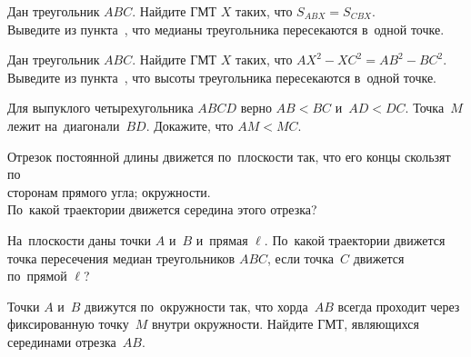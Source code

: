 \begin{problems}
\item
\subproblem{}%
Дан треугольник $ABC$.
Найдите ГМТ $X$ таких, что $S_{ABX} = S_{CBX}$.
\\
\subproblem
Выведите из пункта~,
что медианы треугольника пересекаются в~одной точке.

\item
\subproblem{}%
Дан треугольник $ABC$.
Найдите ГМТ $X$ таких, что $AX^2 - XC^2 = AB^2 - BC^2$.
\\
\subproblem
Выведите из пункта~,
что высоты треугольника пересекаются в~одной точке.


\item
Для выпуклого четырехугольника $ABCD$ верно $AB < BC$ и~$AD < DC$.
Точка~$M$ лежит на~диагонали~$BD$.
Докажите, что $AM < MC$.

\item
Отрезок постоянной длины движется по~плоскости так, что его концы скользят по
\\
\subproblem сторонам прямого угла;
\qquad
\subproblem окружности.
\\
По~какой траектории движется середина этого отрезка?

\item
На~плоскости даны точки $A$ и~$B$ и~прямая $\ell$.
По~какой траектории движется точка пересечения медиан треугольников $ABC$, если
точка~$C$ движется по~прямой $\ell$?

\item
Точки $A$ и~$B$ движутся по~окружности так, что хорда~$AB$ всегда проходит
через фиксированную точку~$M$ внутри окружности.
Найдите ГМТ, являющихся серединами отрезка~$AB$.


\end{problems}

